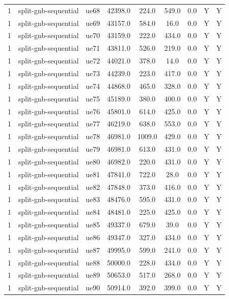 \begin{table}[ht]
\begin{tabular}{|c|c|c|c|c|c|c|c|c|}
1 & split-gnb-sequential & ue68 & 42398.0 & 224.0 & 549.0 & 0.0 & Y & Y \\
1 & split-gnb-sequential & ue69 & 43157.0 & 584.0 & 16.0 & 0.0 & Y & Y \\
1 & split-gnb-sequential & ue70 & 43159.0 & 222.0 & 434.0 & 0.0 & Y & Y \\
1 & split-gnb-sequential & ue71 & 43811.0 & 526.0 & 219.0 & 0.0 & Y & Y \\
1 & split-gnb-sequential & ue72 & 44021.0 & 378.0 & 14.0 & 0.0 & Y & Y \\
1 & split-gnb-sequential & ue73 & 44239.0 & 223.0 & 417.0 & 0.0 & Y & Y \\
1 & split-gnb-sequential & ue74 & 44868.0 & 465.0 & 328.0 & 0.0 & Y & Y \\
1 & split-gnb-sequential & ue75 & 45189.0 & 380.0 & 400.0 & 0.0 & Y & Y \\
1 & split-gnb-sequential & ue76 & 45801.0 & 614.0 & 425.0 & 0.0 & Y & Y \\
1 & split-gnb-sequential & ue77 & 46219.0 & 638.0 & 553.0 & 0.0 & Y & Y \\
1 & split-gnb-sequential & ue78 & 46981.0 & 1009.0 & 429.0 & 0.0 & Y & Y \\
1 & split-gnb-sequential & ue79 & 46981.0 & 613.0 & 431.0 & 0.0 & Y & Y \\
1 & split-gnb-sequential & ue80 & 46982.0 & 220.0 & 431.0 & 0.0 & Y & Y \\
1 & split-gnb-sequential & ue81 & 47841.0 & 722.0 & 28.0 & 0.0 & Y & Y \\
1 & split-gnb-sequential & ue82 & 47848.0 & 373.0 & 416.0 & 0.0 & Y & Y \\
1 & split-gnb-sequential & ue83 & 48476.0 & 595.0 & 431.0 & 0.0 & Y & Y \\
1 & split-gnb-sequential & ue84 & 48481.0 & 225.0 & 425.0 & 0.0 & Y & Y \\
1 & split-gnb-sequential & ue85 & 49337.0 & 679.0 & 39.0 & 0.0 & Y & Y \\
1 & split-gnb-sequential & ue86 & 49347.0 & 327.0 & 434.0 & 0.0 & Y & Y \\
1 & split-gnb-sequential & ue87 & 49995.0 & 599.0 & 241.0 & 0.0 & Y & Y \\
1 & split-gnb-sequential & ue88 & 50000.0 & 228.0 & 434.0 & 0.0 & Y & Y \\
1 & split-gnb-sequential & ue89 & 50653.0 & 517.0 & 268.0 & 0.0 & Y & Y \\
1 & split-gnb-sequential & ue90 & 50914.0 & 392.0 & 399.0 & 0.0 & Y & Y \\

\end{tabular}
\end{table}
